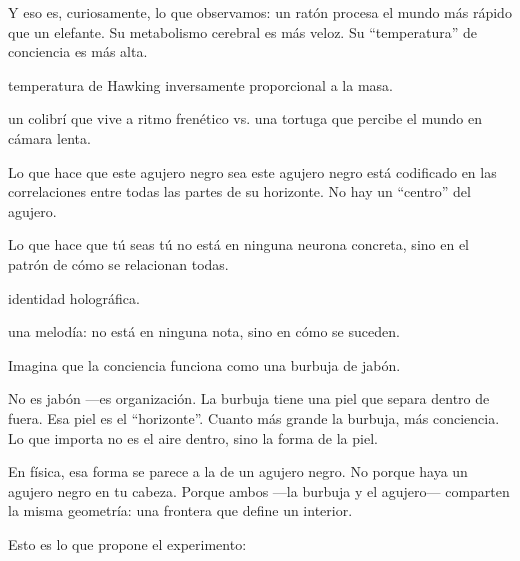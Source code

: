 Y eso es, curiosamente, lo que observamos: un ratón procesa el mundo más rápido que un elefante. Su metabolismo cerebral es más veloz. Su “temperatura” de conciencia es más alta.

\begin{fisica}
 temperatura de Hawking inversamente proporcional a la masa.

 un colibrí que vive a ritmo frenético vs. una tortuga que percibe el mundo en cámara lenta.
\end{fisica}
\noindent Lo que hace que este agujero negro sea este agujero negro está codificado en las correlaciones entre todas las partes de su horizonte. No hay un “centro” del agujero.

Lo que hace que tú seas tú no está en ninguna neurona concreta, sino en el patrón de cómo se relacionan todas.

\begin{fisica}
 identidad holográfica.

 una melodía: no está en ninguna nota, sino en cómo se suceden.
\end{fisica}
\noindent Imagina que la conciencia funciona como una burbuja de jabón.

No es jabón —es organización. La burbuja tiene una piel que separa dentro de fuera. Esa piel es el “horizonte”. Cuanto más grande la burbuja, más conciencia. Lo que importa no es el aire dentro, sino la forma de la piel.

En física, esa forma se parece a la de un agujero negro. No porque haya un agujero negro en tu cabeza. Porque ambos —la burbuja y el agujero— comparten la misma geometría: una frontera que define un interior.

Esto es lo que propone el experimento:

